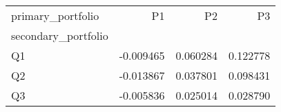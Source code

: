 \begin{tabular}{lrrr}
\toprule
primary_portfolio & P1 & P2 & P3 \\
secondary_portfolio &  &  &  \\
\midrule
Q1 & -0.009465 & 0.060284 & 0.122778 \\
Q2 & -0.013867 & 0.037801 & 0.098431 \\
Q3 & -0.005836 & 0.025014 & 0.028790 \\
\bottomrule
\end{tabular}
